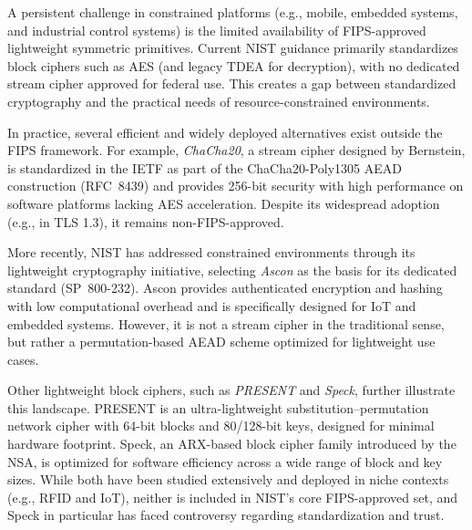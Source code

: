 \documentclass[11pt,a4paper]{article}
\begin{document}
A persistent challenge in constrained platforms (e.g., mobile, embedded systems, and industrial control systems) is the limited availability of FIPS-approved lightweight symmetric primitives. Current NIST guidance primarily standardizes block ciphers such as AES (and legacy TDEA for decryption), with no dedicated stream cipher approved for federal use.\cite{sp800175b,sp800131a} This creates a gap between standardized cryptography and the practical needs of resource-constrained environments.

In practice, several efficient and widely deployed alternatives exist outside the FIPS framework. For example, \textit{ChaCha20}, a stream cipher designed by Bernstein, is standardized in the IETF as part of the ChaCha20-Poly1305 AEAD construction (RFC~8439) and provides 256-bit security with high performance on software platforms lacking AES acceleration.\cite{rfc8439} Despite its widespread adoption (e.g., in TLS 1.3), it remains non-FIPS-approved.

More recently, NIST has addressed constrained environments through its lightweight cryptography initiative, selecting \textit{Ascon} as the basis for its dedicated standard (SP~800-232). Ascon provides authenticated encryption and hashing with low computational overhead and is specifically designed for IoT and embedded systems.\cite{nistlwc} However, it is not a stream cipher in the traditional sense, but rather a permutation-based AEAD scheme optimized for lightweight use cases.

Other lightweight block ciphers, such as \textit{PRESENT} and \textit{Speck}, further illustrate this landscape. PRESENT is an ultra-lightweight substitution–permutation network cipher with 64-bit blocks and 80/128-bit keys, designed for minimal hardware footprint.\cite{present2007} Speck, an ARX-based block cipher family introduced by the NSA, is optimized for software efficiency across a wide range of block and key sizes.\cite{speck2013} While both have been studied extensively and deployed in niche contexts (e.g., RFID and IoT), neither is included in NIST’s core FIPS-approved set, and Speck in particular has faced controversy regarding standardization and trust.
\end{document}
